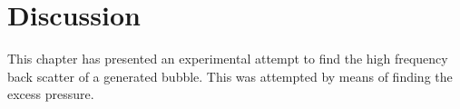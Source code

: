 





\section{Discussion}

This chapter has presented an experimental attempt to find the 
high frequency back scatter of a generated bubble.
This was attempted by means of finding the excess pressure.

